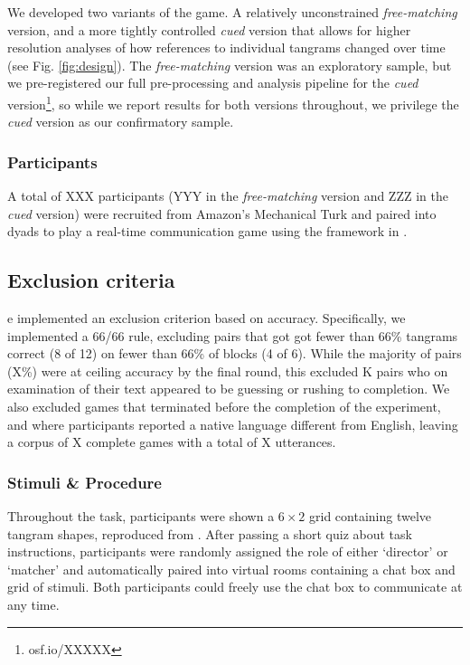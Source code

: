 \documentclass[alpha-refs]{wiley-article}
\begin{document}
We developed two variants of the game. 
A relatively unconstrained \emph{free-matching} version, and a more tightly controlled \emph{cued} version that allows for higher resolution analyses of how references to individual tangrams changed over time (see Fig. \ref{fig:design}). 
The \emph{free-matching} version was an exploratory sample, but we pre-registered our full pre-processing and analysis pipeline for the \emph{cued} version\footnote{osf.io/XXXXX}, so while we report results for both versions throughout, we privilege the \emph{cued} version as our confirmatory sample.

\subsubsection{Participants}\label{participants}

A total of XXX participants (YYY in the \emph{free-matching} version and ZZZ in the \emph{cued} version) were recruited from Amazon's Mechanical Turk and paired into dyads to play a real-time communication game using the framework in \cite{Hawkins15_RealTimeWebExperiments}. 

\subsection{Exclusion criteria}

 e implemented an exclusion criterion based on accuracy. 
Specifically, we implemented a 66/66 rule, excluding pairs that got got fewer than 66\% tangrams correct (8 of 12) on fewer than 66\% of blocks (4 of 6). 
While the majority of pairs (X\%) were at ceiling accuracy by the final round, this excluded K pairs who on examination of their text appeared to be guessing or rushing to completion.
We also excluded games that terminated before the completion of the experiment, and where participants reported a native language different from English, leaving a corpus of X complete games with a total of X utterances.

\subsubsection{Stimuli \& Procedure}\label{stimuli}

Throughout the task, participants were shown a \(6 \times 2\) grid containing twelve tangram shapes, reproduced from \cite{clarkReferringCollaborativeProcess1986}.  
After passing a short quiz about task instructions, participants were randomly assigned the role of either `director' or `matcher' and automatically paired into virtual rooms containing a chat box and grid of stimuli. 
Both participants could freely use the chat box to communicate at any time. 
\end{document}
